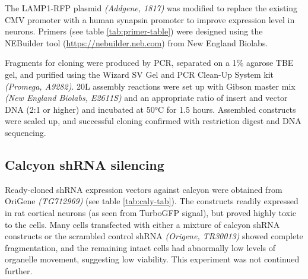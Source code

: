 \documentclass[
  12pt,
  a4paper,
]{book}
\begin{document}
The LAMP1-RFP plasmid \emph{(Addgene, 1817)} was modified to replace the existing CMV promoter with a human synapsin promoter to improve expression level in neurons. Primers (see table \ref{tab:primer-table}) were designed using the NEBuilder tool (\url{https://nebuilder.neb.com}) from New England Biolabs.

\begin{table}

\caption{\label{tab:primer-table}Gibson cloning primers.}
\centering
{}
\end{table}

Fragments for cloning were produced by PCR, separated on a 1\% agarose TBE gel, and purified using the Wizard SV Gel and PCR Clean-Up System kit \emph{(Promega, A9282)}. 20\textmu{}L assembly reactions were set up with Gibson master mix \emph{(New England Biolabs, E2611S)} and an appropriate ratio of insert and vector DNA (2:1 or higher) and incubated at 50°C for 1.5 hours. Assembled constructs were scaled up, and successful cloning confirmed with restriction digest and DNA sequencing.

\hypertarget{calcyon-shrna-silencing}{%
\subsection{Calcyon shRNA silencing}\label{calcyon-shrna-silencing}}

Ready-cloned shRNA expression vectors against calcyon were obtained from OriGene \emph{(TG712969)} (see table \ref{tab:caly-tab}). The constructs readily expressed in rat cortical neurons (as seen from TurboGFP signal), but proved highly toxic to the cells. Many cells transfected with either a mixture of calcyon shRNA constructs or the scrambled control shRNA \emph{(Origene, TR30013)} showed complete fragmentation, and the remaining intact cells had abnormally low levels of organelle movement, suggesting low viability. This experiment was not continued further.
\end{document}
